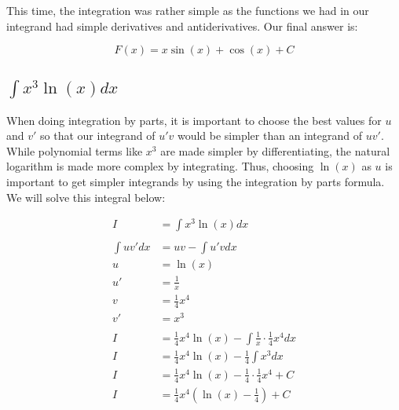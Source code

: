 \documentclass[12pt]{article}
\begin{document}
This time, the integration was rather simple as the functions we had in our integrand had simple derivatives and antiderivatives.
Our final answer is:

$$
    F(x) = x\sin(x) + \cos(x) + C
$$

\subsection{$\int x^3 \ln(x) dx$}

When doing integration by parts, it is important to choose the best values for $u$ and $v'$ so that our integrand of $u'v$ would be simpler than an integrand of $uv'$.
While polynomial terms like $x^3$ are made simpler by differentiating, the natural logarithm is made more complex by integrating.
Thus, choosing $\ln(x)$ as $u$ is important to get simpler integrands by using the integration by parts formula.
We will solve this integral below:


\begin{align}
    I           & = \int x^3 \ln(x) dx                                              \\
    \nonumber                                                                       \\
    \int uv' dx & = uv - \int u'v dx                                                \\
    u           & = \ln(x)                                                          \\
    u'          & = \frac{1}{x}                                                     \\
    v           & = \frac{1}{4}x^4                                                  \\
    v'          & = x^3                                                             \\
    \nonumber                                                                       \\
    I           & = \frac{1}{4}x^4\ln(x) - \int \frac{1}{x} \cdot \frac{1}{4}x^4 dx \\
    I           & = \frac{1}{4}x^4\ln(x) - \frac{1}{4} \int x^3 dx                  \\
    I           & = \frac{1}{4}x^4\ln(x) - \frac{1}{4} \cdot \frac{1}{4}x^4 + C     \\
    I           & = \frac{1}{4}x^4\left(\ln(x) - \frac{1}{4}\right) + C
\end{align}
\end{document}
